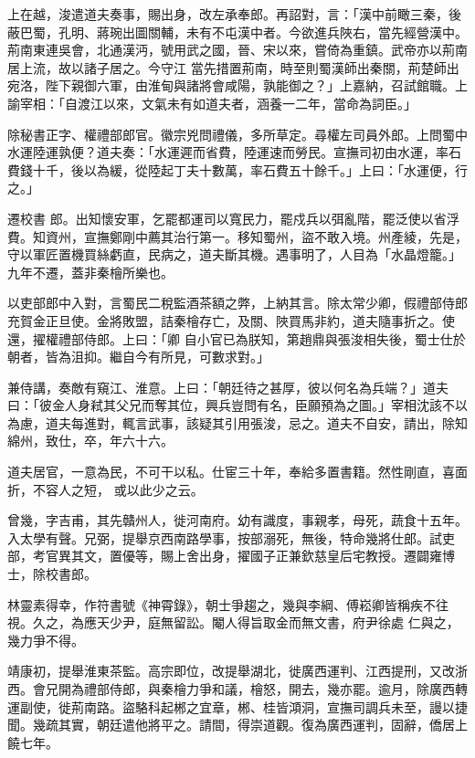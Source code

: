 \begin{pinyinscope}
 上在越，浚遣道夫奏事，賜出身，改左承奉郎。再詔對，言：「漢中前瞰三秦，後蔽巴蜀，孔明、蔣琬出圖關輔，未有不屯漢中者。今欲進兵陜右，當先經營漢中。荊南東連吳會，北通漢沔，號用武之國，晉、宋以來，嘗倚為重鎮。武帝亦以荊南居上流，故以諸子居之。今守江
 當先措置荊南，時至則蜀漢師出秦關，荊楚師出宛洛，陛下親御六軍，由淮甸與諸將會咸陽，孰能御之？」上嘉納，召試館職。上諭宰相：「自渡江以來，文氣未有如道夫者，涵養一二年，當命為詞臣。」



 除秘書正字、權禮部郎官。徽宗兇問禮儀，多所草定。尋權左司員外郎。上問蜀中水運陸運孰便？道夫奏：「水運遲而省費，陸運速而勞民。宣撫司初由水運，率石費錢十千，後以為緩，從陸起丁夫十數萬，率石費五十餘千。」上曰：「水運便，行之。」



 遷校書
 郎。出知懷安軍，乞罷都運司以寬民力，罷戍兵以弭亂階，罷泛使以省浮費。知資州，宣撫鄭剛中薦其治行第一。移知蜀州，盜不敢入境。州產綾，先是，守以軍匠置機買絲虧直，民病之，道夫斷其機。遇事明了，人目為「水晶燈籠。」九年不遷，蓋非秦檜所樂也。



 以吏部郎中入對，言蜀民二稅監酒茶額之弊，上納其言。除太常少卿，假禮部侍郎充賀金正旦使。金將敗盟，詰秦檜存亡，及關、陜買馬非約，道夫隨事折之。使還，擢權禮部侍郎。上曰：「卿
 自小官已為朕知，第趙鼎與張浚相失後，蜀士仕於朝者，皆為沮抑。繼自今有所見，可數求對。」



 兼侍講，奏敵有窺江、淮意。上曰：「朝廷待之甚厚，彼以何名為兵端？」道夫曰：「彼金人身弒其父兄而奪其位，興兵豈問有名，臣願預為之圖。」宰相沈該不以為慮，道夫每進對，輒言武事，該疑其引用張浚，忌之。道夫不自安，請出，除知綿州，致仕，卒，年六十六。



 道夫居官，一意為民，不可干以私。仕宦三十年，奉給多置書籍。然性剛直，喜面折，不容人之短，
 或以此少之云。



 曾幾，字吉甫，其先贛州人，徙河南府。幼有識度，事親孝，母死，蔬食十五年。入太學有聲。兄弼，提舉京西南路學事，按部溺死，無後，特命幾將仕郎。試吏部，考官異其文，置優等，賜上舍出身，擢國子正兼欽慈皇后宅教授。遷闢雍博士，除校書郎。



 林靈素得幸，作符書號《神霄錄》，朝士爭趨之，幾與李綱、傅崧卿皆稱疾不往視。久之，為應天少尹，庭無留訟。閹人得旨取金而無文書，府尹徐處
 仁與之，幾力爭不得。



 靖康初，提舉淮東茶監。高宗即位，改提舉湖北，徙廣西運判、江西提刑，又改浙西。會兄開為禮部侍郎，與秦檜力爭和議，檜怒，開去，幾亦罷。逾月，除廣西轉運副使，徙荊南路。盜駱科起郴之宜章，郴、桂皆澒洞，宣撫司調兵未至，謾以捷聞。幾疏其實，朝廷遣他將平之。請間，得崇道觀。復為廣西運判，固辭，僑居上饒七年。




\end{pinyinscope}
